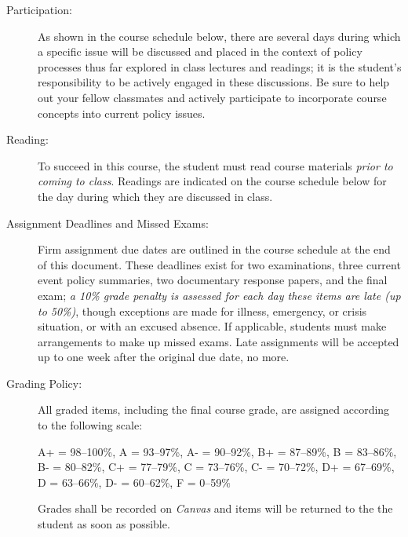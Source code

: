 \documentclass[11pt]{article}
\begin{document}
\begin{description}
\begin{description}
	\item[Participation:] As shown in the course schedule below, there are several days during which a specific issue will be discussed and placed in the context of policy processes thus far explored in class lectures and readings; it is the student's responsibility to be actively engaged in these discussions. Be sure to help out your fellow classmates and actively participate to incorporate course concepts into current policy issues. 
	
	\item[Reading:] To succeed in this course, the student must read course materials \emph{prior to coming to class}. Readings are indicated on the course schedule below for the day during which they are discussed in class. 
	
	\item[Assignment Deadlines and Missed Exams:] Firm assignment due dates are outlined in the course schedule at the end of this document. These deadlines exist for two examinations, three current event policy summaries, two documentary response papers, and the final exam; \emph{a 10\% grade penalty is assessed for each day these items are late (up to 50\%)}, though exceptions are made for illness, emergency, or crisis situation, or with an excused absence. If applicable, students must make arrangements to make up missed exams. Late assignments will be accepted up to one week after the original due date, no more. 
	
	\item[Grading Policy:] All graded items, including the final course grade,
	are assigned according to the following scale:
	\begin{center}

		A+ = 98--100\%, A = 93--97\%, A- = 90--92\%, B+ = 87--89\%, B = 83--86\%, \\ B- = 80--82\%, C+ = 77--79\%, C = 73--76\%, C- = 70--72\%, D+ = 67--69\%, \\ D = 63--66\%, D- = 60--62\%, F = 0--59\%

	\end{center}
	Grades shall be recorded on \emph{Canvas} and items will be returned to the
	the student as soon as possible.
	

\end{description}
\end{description}
\end{document}
